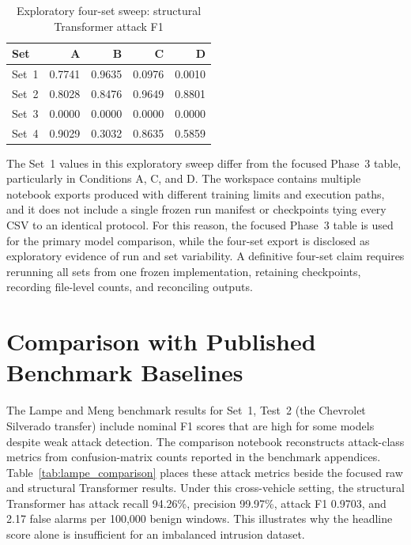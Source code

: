 \documentclass[12pt, a4paper, reqno, oneside]{book}
\begin{document}
\begin{table}[htbp]
\centering
\caption{Exploratory four-set sweep: structural Transformer attack F1}
\label{tab:multiset_sweep}
\begin{tabular}{lrrrr}
\hline
\textbf{Set} & \textbf{A} & \textbf{B} & \textbf{C} & \textbf{D} \\
\hline
Set~1 & 0.7741 & 0.9635 & 0.0976 & 0.0010 \\
Set~2 & 0.8028 & 0.8476 & 0.9649 & 0.8801 \\
Set~3 & 0.0000 & 0.0000 & 0.0000 & 0.0000 \\
Set~4 & 0.9029 & 0.3032 & 0.8635 & 0.5859 \\
\hline
\end{tabular}
\end{table}

The Set~1 values in this exploratory sweep differ from the focused Phase~3 table, particularly in Conditions A, C, and D. The workspace contains multiple notebook exports produced with different training limits and execution paths, and it does not include a single frozen run manifest or checkpoints tying every CSV to an identical protocol. For this reason, the focused Phase~3 table is used for the primary model comparison, while the four-set export is disclosed as exploratory evidence of run and set variability. A definitive four-set claim requires rerunning all sets from one frozen implementation, retaining checkpoints, recording file-level counts, and reconciling outputs.

\section{Comparison with Published Benchmark Baselines}
\label{sec:benchmark_comparison}
The Lampe and Meng benchmark results for Set~1, Test~2 (the Chevrolet Silverado transfer) include nominal F1 scores that are high for some models despite weak attack detection. The comparison notebook reconstructs attack-class metrics from confusion-matrix counts reported in the benchmark appendices. Table~\ref{tab:lampe_comparison} places these attack metrics beside the focused raw and structural Transformer results. Under this cross-vehicle setting, the structural Transformer has attack recall 94.26\%, precision 99.97\%, attack F1 0.9703, and 2.17 false alarms per 100,000 benign windows. This illustrates why the headline score alone is insufficient for an imbalanced intrusion dataset.
\end{document}
